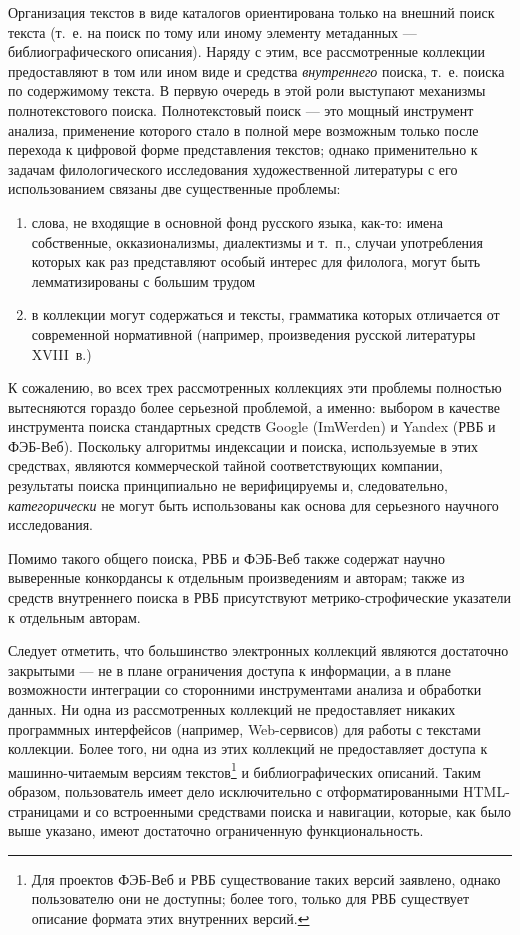 \documentclass[12pt]{article}
\begin{document}
Организация текстов в виде каталогов ориентирована только на внешний поиск текста (т.~е. на поиск по тому или иному
элементу метаданных --- библиографического описания). Наряду с этим, все рассмотренные коллекции предоставляют в том или
ином виде и средства \emph{внутреннего} поиска, т.~е. поиска по содержимому текста. В первую очередь в этой роли выступают
механизмы полнотекстового поиска. Полнотекстовый поиск --- это мощный инструмент анализа, применение которого стало в полной
мере возможным только после перехода к цифровой форме представления текстов; однако применительно к задачам филологического
исследования художественной литературы с его использованием связаны две существенные проблемы:
\begin{enumerate}
\item слова, не входящие в основной фонд русского языка, как-то: имена собственные, окказионализмы, диалектизмы и т.~п.,
  случаи употребления которых как раз представляют особый интерес для филолога, могут быть лемматизированы с большим
  трудом
\item в коллекции могут содержаться и тексты, грамматика которых отличается от современной нормативной (например,
  произведения русской литературы XVIII~в.)
\end{enumerate}

К сожалению, во всех трех рассмотренных коллекциях эти проблемы полностью вытесняются гораздо более серьезной проблемой,
а именно: выбором в качестве инструмента поиска стандартных средств Google (ImWerden) и Yandex (РВБ и ФЭБ-Веб).
Поскольку алгоритмы индексации и поиска, используемые в этих средствах, являются коммерческой тайной соответствующих
компании, результаты поиска принципиально не верифицируемы и, следовательно, \emph{категорически} не могут быть использованы
как основа для серьезного научного исследования.

Помимо такого общего поиска, РВБ и ФЭБ-Веб также содержат научно выверенные конкордансы к отдельным произведениям и
авторам; также из средств внутреннего поиска в РВБ присутствуют метрико-строфические указатели к отдельным авторам.

Следует отметить, что большинство электронных коллекций являются достаточно закрытыми --- не в плане ограничения доступа
к информации, а в плане возможности интеграции со сторонними инструментами анализа и обработки данных. Ни одна из рассмотренных
коллекций не предоставляет никаких программных интерфейсов (например, Web-сервисов) для работы с текстами коллекции. Более того,
ни одна из этих коллекций не предоставляет доступа к машинно-читаемым версиям текстов\footnote{Для проектов ФЭБ-Веб и РВБ существование
таких версий заявлено, однако пользователю они не доступны; более того, только для РВБ существует описание формата этих
внутренних версий.}   и библиографических описаний.
Таким образом, пользователь имеет дело исключительно с отформатированными HTML-страницами и со встроенными средствами
поиска и навигации, которые, как было выше указано, имеют достаточно ограниченную функциональность.
\end{document}

